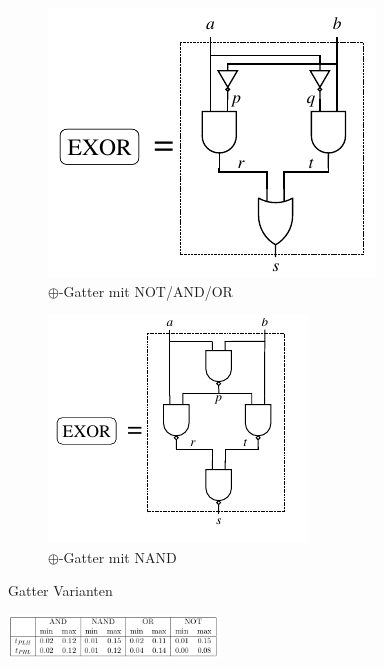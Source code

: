\documentclass{scrartcl}[9pt, a4paper]
\begin{document}
\begin{figure}[h]
	\begin{subfigure}[b]{.5\textwidth}
		\centering
		\includegraphics[width=.65\linewidth]{figs/xor3}
		\caption{$\oplus$-Gatter mit NOT/AND/OR}
		\label{notandor}
	\end{subfigure}%
	\begin{subfigure}[b]{.5\textwidth}
		\centering
		\includegraphics[width=.65\linewidth]{figs/xor2}
		\caption{$\oplus$-Gatter mit NAND}
		\label{nand}
	\end{subfigure}%
	\caption{Gatter Varianten}
\end{figure}

\begin{figure}[h]
	\centering
	\includegraphics[width=0.5\textwidth]{figs/timings}
	\label{oplus4}
\end{figure}


\end{document}
